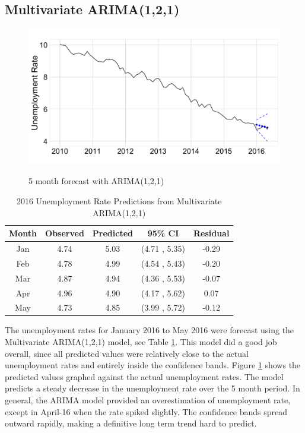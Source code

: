 \documentclass[twoside,twocolumn]{article}
\begin{document}
\subsection{Multivariate ARIMA(1,2,1)}

   \begin{figure}[htb]
    	\centering
     	\caption{5 month forecast with ARIMA(1,2,1)}
     	\includegraphics[width=\linewidth]{images/ARIMApred}
     	\label{fig:arimapred}
 \end{figure}

\begin{table}[ht]
\centering
\caption{2016 Unemployment Rate Predictions from Multivariate ARIMA(1,2,1)}
\label{tab:arimaforecast}
\begin{tabular}{ccccc}
  \hline
 Month & Observed & Predicted& 95\% CI  & Residual \\ 
  \hline
Jan & 4.74 & 5.03 & (4.71 , 5.35) & -0.29 \\ 
Feb & 4.78 & 4.99 & (4.54 , 5.43) & -0.20 \\ 
Mar & 4.87 & 4.94 & (4.36 , 5.53) & -0.07 \\ 
Apr & 4.96 & 4.90 & (4.17 , 5.62) & 0.07 \\ 
May & 4.73 & 4.85 & (3.99 , 5.72) & -0.12 \\ 
   \hline
\end{tabular}
\end{table}

The unemployment rates for January 2016 to May 2016 were forecast using the Multivariate ARIMA(1,2,1) model, see Table \ref{tab:arimaforecast}.  This model did a good job overall, since all predicted values were relatively close to the actual unemployment rates and entirely inside the confidence bands.  Figure \ref{fig:arimapred} shows the predicted values graphed against the actual unemployment rates. The model predicts a steady decrease in the unemployment rate over the 5 month period.  In general, the ARIMA model provided an overestimation of unemployment rate, except in April-16 when the rate spiked slightly. The confidence bands spread outward rapidly, making a definitive long term trend hard to predict.
\end{document}
